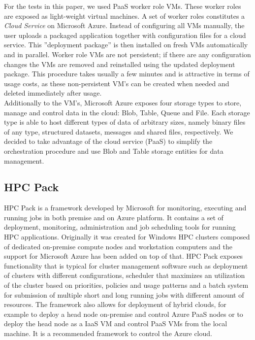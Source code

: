 \documentclass[3p,times]{elsarticle}
\begin{document}
For the tests in this paper, we used PaaS worker role VMs. These worker roles are exposed as light-weight virtual machines. A set of worker roles constitutes a {\it Cloud Service} on Microsoft Azure. Instead of configuring all VMs manually, the user uploads a packaged application together with configuration files for a cloud service. This ''deployment package'' is then installed on fresh VMs automatically and in parallel. Worker role VMs are not persistent; if there are any configuration changes the VMs are removed and reinstalled using the updated deployment package. This procedure takes usually a few minutes and is attractive in terms of usage costs, as these non-persistent VM's can be created when needed and deleted immediately after usage. \\

Additionally to the VM's, Microsoft Azure exposes four storage types to store, manage and control data in the cloud: Blob, Table, Queue and File. Each storage type is able to host different types of data of arbitrary sizes, namely binary files of any type, structured datasets, messages and shared files, respectively. 
We decided to take advantage of the cloud service (PaaS) to simplify the orchestration procedure and use Blob and Table storage entities for data management. 

\subsection{HPC Pack}

HPC Pack is a framework developed by Microsoft for monitoring, executing and running jobs in both premise and on Azure platform. It contains a set of deployment, monitoring, administration and job scheduling tools for running HPC applications. Originally it was created for Windows HPC clusters composed of dedicated on-premise compute nodes and workstation computers and the support for Microsoft Azure has been added on top of that. HPC Pack exposes functionality that is typical for cluster management software such as deployment of clusters with different configurations, scheduler that maximizes an utilization of the cluster based on priorities, policies and usage patterns and a batch system for submission of multiple short and long running jobs with different amount of resources. The framework also allows for deployment of hybrid clouds, for example to deploy a head node on-premise and control Azure PaaS nodes or to deploy the head node as a IaaS VM and control PaaS VMs from the local machine. It is a recommended framework to control the Azure cloud.
\end{document}
